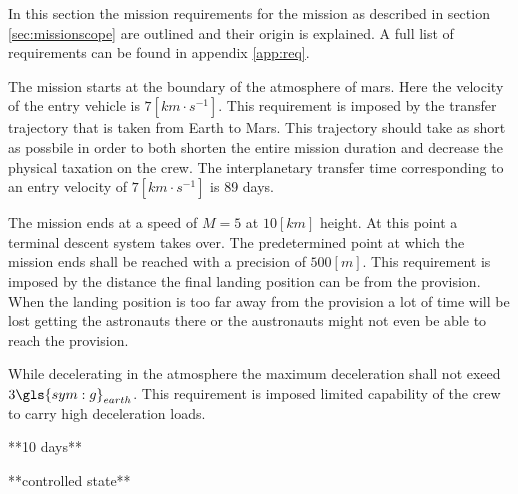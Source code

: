 In this section the mission requirements for the mission as described in section \ref{sec:missionscope} are outlined and their origin is explained. A full list of requirements can be found in appendix \ref{app:req}.

The mission starts at the boundary of the atmosphere of mars. Here the velocity of the entry vehicle is $7 \left[km \cdot s^{-1} \right]$. This requirement is imposed by the transfer trajectory that is taken from Earth to Mars. This trajectory should take as short as possbile in order to both shorten the entire mission duration and decrease the physical taxation on the crew. The interplanetary transfer time corresponding to an entry velocity of $7 \left[km \cdot s^{-1} \right]$ is 89 days. 

The mission ends at a speed of $M=5$ at $10 \left[km\right]$ height. At this point a terminal descent system takes over. The predetermined point at which the mission ends shall be reached with a precision of $500 \left[m\right]$. This requirement is imposed by the distance the final landing position can be from the provision. When the landing position is too far away from the provision a lot of time will be lost getting the astronauts there or the austronauts might not even be able to reach the provision.

While decelerating in the atmosphere the maximum deceleration shall not exeed $3\gls{sym:g}_{earth}$. This requirement is imposed limited capability of the crew to carry high deceleration loads.

**10 days**

**controlled state**



